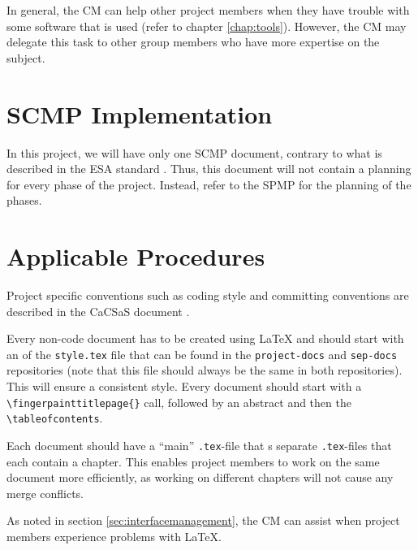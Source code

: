 In general, the CM can help other project members when they have trouble with some software that is used (refer to chapter \ref{chap:tools}). However, the CM may delegate this task to other group members who have more expertise on the subject.

\section{SCMP Implementation}
In this project, we will have only one SCMP document, contrary to what is described in the ESA standard \cite{esa}. Thus, this document will not contain a planning for every phase of the project. Instead, refer to the SPMP for the planning of the phases.

\section{Applicable Procedures}
Project specific conventions such as coding style and committing conventions are described in the CaCSaS document \cite{cacsas}.

Every non-code document has to be created using \LaTeX{} and should start with an \verb|| of the \texttt{style.tex} file that can be found in the \texttt{project-docs} and \texttt{sep-docs} repositories (note that this file should always be the same in both repositories). This will ensure a consistent style. Every document should start with a \verb|\fingerpainttitlepage{}| call, followed by an abstract and then the \verb|\tableofcontents|.

Each document should have a ``main'' \texttt{.tex}-file that \verb||s separate \texttt{.tex}-files that each contain a chapter. This enables project members to work on the same document more efficiently, as working on different chapters will not cause any merge conflicts.

As noted in section \ref{sec:interfacemanagement}, the CM can assist when project members experience problems with \LaTeX{}.